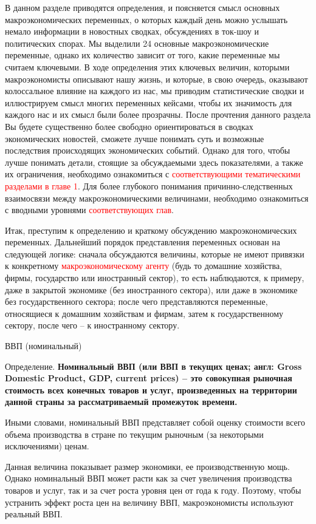 \documentclass[12pt,a4paper]{article}
\begin{document}
В данном разделе приводятся определения, и поясняется смысл основных макроэкономических переменных, о которых каждый день можно услышать немало информации в новостных сводках, обсуждениях в ток-шоу и политических спорах. Мы выделили 24 основные макроэкономические переменные, однако их количество зависит от того, какие переменные мы считаем ключевыми. В ходе определения этих ключевых величин, которыми макроэкономисты описывают нашу жизнь, и которые, в свою очередь, оказывают колоссальное влияние на каждого из нас, мы приводим статистические сводки и иллюстрируем смысл многих переменных кейсами, чтобы их значимость для каждого нас и их смысл были более прозрачны. 
После прочтения данного раздела Вы будете существенно более свободно ориентироваться в сводках экономических новостей, сможете лучше понимать суть и возможные последствия происходящих экономических событий. Однако для того, чтобы лучше понимать детали, стоящие за обсуждаемыми здесь показателями, а также их ограничения, необходимо ознакомиться с \textcolor{red}{соответствующими тематическими разделами в главе 1}. Для более глубокого понимания причинно-следственных взаимосвязи между макроэкономическими величинами, необходимо ознакомиться с вводными уровнями \textcolor{red}{соответствующих глав}.

Итак, преступим к определению и краткому обсуждению макроэкономических переменных. Дальнейший порядок представления переменных основан на следующей логике: сначала обсуждаются величины, которые не имеют привязки к конкретному \textcolor{red}{макроэкономическому агенту} (будь то домашние хозяйства, фирмы, государство или иностранный сектор), то есть наблюдаются, к примеру, даже в закрытой экономике (без иностранного сектора), или даже в экономике без государственного сектора; после чего представляются переменные, относящиеся к домашним хозяйствам и фирмам, затем к государственному сектору, после чего – к иностранному сектору.

	ВВП (номинальный) 

Определение. \bf{Номинальный ВВП} (или ВВП в текущих ценах; англ: Gross Domestic Product, GDP, current prices) – это совокупная рыночная стоимость всех конечных товаров и услуг, произведенных на территории данной страны за рассматриваемый промежуток времени.

Иными словами, номинальный ВВП представляет собой оценку стоимости всего объема производства в стране по текущим рыночным (за некоторыми исключениями) ценам.

Данная величина показывает размер экономики, ее производственную мощь. Однако номинальный ВВП может расти как за счет увеличения производства товаров и услуг, так и за счет роста уровня цен от года к году. Поэтому, чтобы устранить эффект роста цен на величину ВВП, макроэкономисты используют реальный ВВП.
\end{document}

